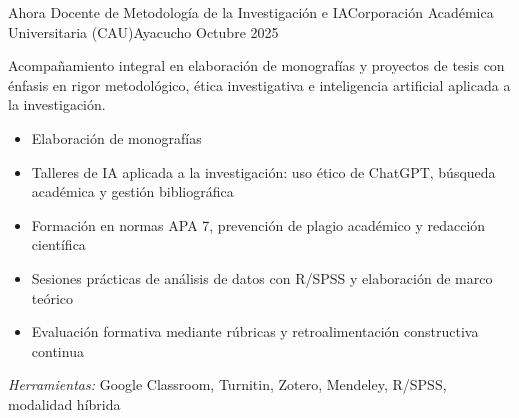 \experience
{Ahora} {Docente de Metodología de la Investigación e IA}{Corporación Académica Universitaria (CAU)}{Ayacucho}
{Octubre 2025} {
	Acompañamiento integral en elaboración de monografías y proyectos de tesis con énfasis en rigor metodológico, ética investigativa e inteligencia artificial aplicada a la investigación.
	\begin{itemize}
		\item Elaboración de monografías
		\item Talleres de IA aplicada a la investigación: uso ético de ChatGPT, búsqueda académica y gestión bibliográfica
		\item Formación en normas APA 7, prevención de plagio académico y redacción científica
		\item Sesiones prácticas de análisis de datos con R/SPSS y elaboración de marco teórico
		\item Evaluación formativa mediante rúbricas y retroalimentación constructiva continua
	\end{itemize}
}
{\footnotesize{\emph{Herramientas:} Google Classroom, Turnitin, Zotero, Mendeley, R/SPSS, modalidad híbrida}}
